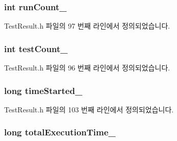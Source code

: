 \subsubsection[{\texorpdfstring{run\+Count\+\_\+}{runCount_}}]{\setlength{\rightskip}{0pt plus 5cm}int run\+Count\+\_\+\hspace{0.3cm}{\ttfamily [private]}}\hypertarget{class_test_result_a12d866d171e7cdbda3f2720d559d7d78}{}\label{class_test_result_a12d866d171e7cdbda3f2720d559d7d78}


Test\+Result.\+h 파일의 97 번째 라인에서 정의되었습니다.

\subsubsection[{\texorpdfstring{test\+Count\+\_\+}{testCount_}}]{\setlength{\rightskip}{0pt plus 5cm}int test\+Count\+\_\+\hspace{0.3cm}{\ttfamily [private]}}\hypertarget{class_test_result_ace881ee661bae3d8b8d63b6888f80a36}{}\label{class_test_result_ace881ee661bae3d8b8d63b6888f80a36}


Test\+Result.\+h 파일의 96 번째 라인에서 정의되었습니다.

\subsubsection[{\texorpdfstring{time\+Started\+\_\+}{timeStarted_}}]{\setlength{\rightskip}{0pt plus 5cm}long time\+Started\+\_\+\hspace{0.3cm}{\ttfamily [private]}}\hypertarget{class_test_result_a388eb648c1723943446ff1de3595b10b}{}\label{class_test_result_a388eb648c1723943446ff1de3595b10b}


Test\+Result.\+h 파일의 103 번째 라인에서 정의되었습니다.

\subsubsection[{\texorpdfstring{total\+Execution\+Time\+\_\+}{totalExecutionTime_}}]{\setlength{\rightskip}{0pt plus 5cm}long total\+Execution\+Time\+\_\+\hspace{0.3cm}{\ttfamily [private]}}\hypertarget{class_test_result_ae617e59ed28cde2b6d69c8e0143a839b}{}\label{class_test_result_ae617e59ed28cde2b6d69c8e0143a839b}


